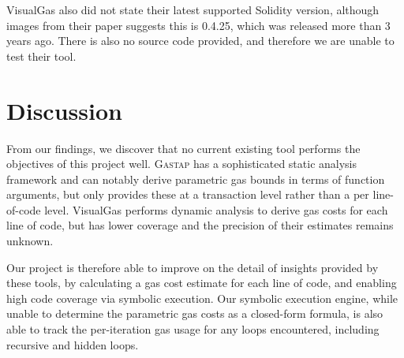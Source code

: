 VisualGas also did not state their latest supported Solidity version, although images from their
paper suggests this is 0.4.25, which was released more than 3 years ago. There is also no source code
provided, and therefore we are unable to test their tool.



\section{Discussion}
From our findings, we discover that no current existing tool performs the objectives of this project
well. \textsc{Gastap} has a sophisticated static analysis framework and can notably derive parametric gas
bounds in terms of function arguments, but only provides these at a transaction level rather than
a per line-of-code level. VisualGas performs dynamic analysis to derive gas costs for each line of
code, but has lower coverage and the precision of their estimates remains unknown.

Our project is therefore able to improve on the detail of insights provided by these tools, by calculating a 
gas cost estimate for each line
of code, and enabling high code coverage via symbolic execution. Our symbolic execution engine, while
unable to determine the parametric gas costs as a closed-form formula, is also able to track the
per-iteration gas usage for any loops encountered, including recursive and hidden loops.